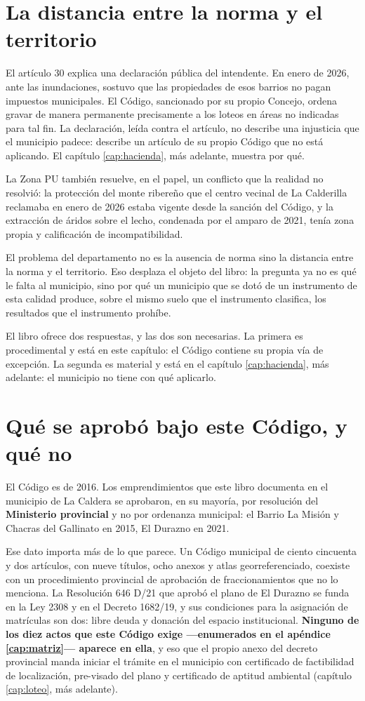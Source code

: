\section{La distancia entre la norma y el territorio}

El artículo 30 explica una declaración pública del intendente. En enero de 2026, ante las inundaciones, sostuvo que las propiedades de esos barrios no pagan impuestos municipales. El Código, sancionado por su propio Concejo, ordena gravar de manera permanente precisamente a los loteos en áreas no indicadas para tal fin. La declaración, leída contra el artículo, no describe una injusticia que el municipio padece: describe un artículo de su propio Código que no está aplicando. El capítulo \ref{cap:hacienda}, más adelante, muestra por qué.

La Zona PU también resuelve, en el papel, un conflicto que la realidad no resolvió: la protección del monte ribereño que el centro vecinal de La Calderilla reclamaba en enero de 2026 estaba vigente desde la sanción del Código, y la extracción de áridos sobre el lecho, condenada por el amparo de 2021, tenía zona propia y calificación de incompatibilidad.

El problema del departamento no es la ausencia de norma sino la distancia entre la norma y el territorio. Eso desplaza el objeto del libro: la pregunta ya no es qué le falta al municipio, sino por qué un municipio que se dotó de un instrumento de esta calidad produce, sobre el mismo suelo que el instrumento clasifica, los resultados que el instrumento prohíbe.

El libro ofrece dos respuestas, y las dos son necesarias. La primera es procedimental y está en este capítulo: el Código contiene su propia vía de excepción. La segunda es material y está en el capítulo \ref{cap:hacienda}, más adelante: el municipio no tiene con qué aplicarlo.

\section{Qué se aprobó bajo este Código, y qué no}

El Código es de 2016. Los emprendimientos que este libro documenta en el municipio de La
Caldera se aprobaron, en su mayoría, por resolución del \textbf{Ministerio provincial} y no
por ordenanza municipal: el Barrio La Misión y Chacras del Gallinato en 2015, El Durazno en
2021.

Ese dato importa más de lo que parece. Un Código municipal de ciento cincuenta y dos
artículos, con nueve títulos, ocho anexos y atlas georreferenciado, coexiste con un
procedimiento provincial de aprobación de fraccionamientos que no lo menciona. La Resolución
646 D/21 que aprobó el plano de El Durazno se funda en la Ley 2308 y en el Decreto 1682/19,
y sus condiciones para la asignación de matrículas son dos: libre deuda y donación del
espacio institucional. \textbf{Ninguno de los diez actos que este Código exige ---enumerados en el apéndice \ref{cap:matriz}--- aparece en ella}, y eso que el propio anexo del decreto provincial manda iniciar el trámite en el municipio con certificado de factibilidad de localización, pre-visado del plano y certificado de aptitud ambiental (capítulo \ref{cap:loteo}, más adelante).

